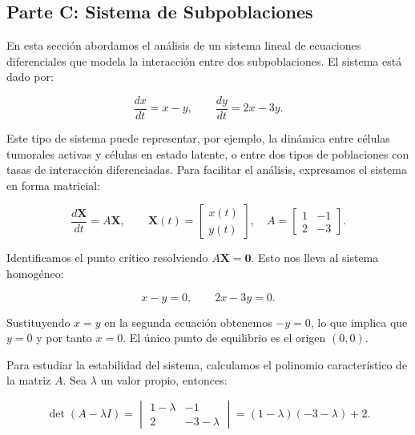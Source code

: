\documentclass[a4paper,10pt,twocolumn]{article}
\begin{document}
\subsection{Parte C: Sistema de Subpoblaciones}\label{subsec:parte-c}


En esta sección abordamos el análisis de un sistema lineal de ecuaciones diferenciales que modela la interacción entre dos subpoblaciones. El sistema está dado por:



\[
\frac{dx}{dt} = x - y, \qquad \frac{dy}{dt} = 2x - 3y.
\]



Este tipo de sistema puede representar, por ejemplo, la dinámica entre células tumorales activas y células en estado latente, o entre dos tipos de poblaciones con tasas de interacción diferenciadas. Para facilitar el análisis, expresamos el sistema en forma matricial:



\[
\frac{d\bm{X}}{dt} = A \bm{X}, \qquad 
\bm{X}(t) = \begin{bmatrix} x(t) \\ y(t) \end{bmatrix}, \quad
A = \begin{bmatrix} 1 & -1 \\ 2 & -3 \end{bmatrix}.
\]



Identificamos el punto crítico resolviendo \( A \bm{X} = \bm{0} \). Esto nos lleva al sistema homogéneo:



\[
x - y = 0, \qquad 2x - 3y = 0.
\]



Sustituyendo \( x = y \) en la segunda ecuación obtenemos \( -y = 0 \), lo que implica que \( y = 0 \) y por tanto \( x = 0 \). El único punto de equilibrio es el origen \( (0,0) \).

Para estudiar la estabilidad del sistema, calculamos el polinomio característico de la matriz \( A \). Sea \( \lambda \) un valor propio, entonces:



\[
\det(A - \lambda I) = 
\begin{vmatrix}
1 - \lambda & -1 \\
2 & -3 - \lambda
\end{vmatrix}
= (1 - \lambda)(-3 - \lambda) + 2.
\]
\end{document}
